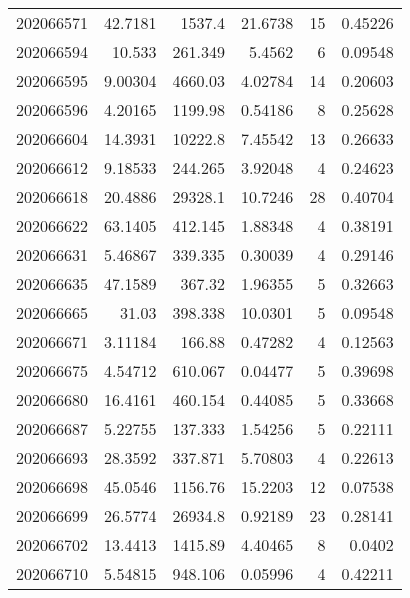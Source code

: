 \begin{tabular}{rrrrrr}
 202066571 &         42.7181  &     1537.4    &           21.6738  &          15 & 0.45226 \\
 202066594 &         10.533   &      261.349  &            5.4562  &           6 & 0.09548 \\
 202066595 &          9.00304 &     4660.03   &            4.02784 &          14 & 0.20603 \\
 202066596 &          4.20165 &     1199.98   &            0.54186 &           8 & 0.25628 \\
 202066604 &         14.3931  &    10222.8    &            7.45542 &          13 & 0.26633 \\
 202066612 &          9.18533 &      244.265  &            3.92048 &           4 & 0.24623 \\
 202066618 &         20.4886  &    29328.1    &           10.7246  &          28 & 0.40704 \\
 202066622 &         63.1405  &      412.145  &            1.88348 &           4 & 0.38191 \\
 202066631 &          5.46867 &      339.335  &            0.30039 &           4 & 0.29146 \\
 202066635 &         47.1589  &      367.32   &            1.96355 &           5 & 0.32663 \\
 202066665 &         31.03    &      398.338  &           10.0301  &           5 & 0.09548 \\
 202066671 &          3.11184 &      166.88   &            0.47282 &           4 & 0.12563 \\
 202066675 &          4.54712 &      610.067  &            0.04477 &           5 & 0.39698 \\
 202066680 &         16.4161  &      460.154  &            0.44085 &           5 & 0.33668 \\
 202066687 &          5.22755 &      137.333  &            1.54256 &           5 & 0.22111 \\
 202066693 &         28.3592  &      337.871  &            5.70803 &           4 & 0.22613 \\
 202066698 &         45.0546  &     1156.76   &           15.2203  &          12 & 0.07538 \\
 202066699 &         26.5774  &    26934.8    &            0.92189 &          23 & 0.28141 \\
 202066702 &         13.4413  &     1415.89   &            4.40465 &           8 & 0.0402  \\
 202066710 &          5.54815 &      948.106  &            0.05996 &           4 & 0.42211 \\

\end{tabular}
